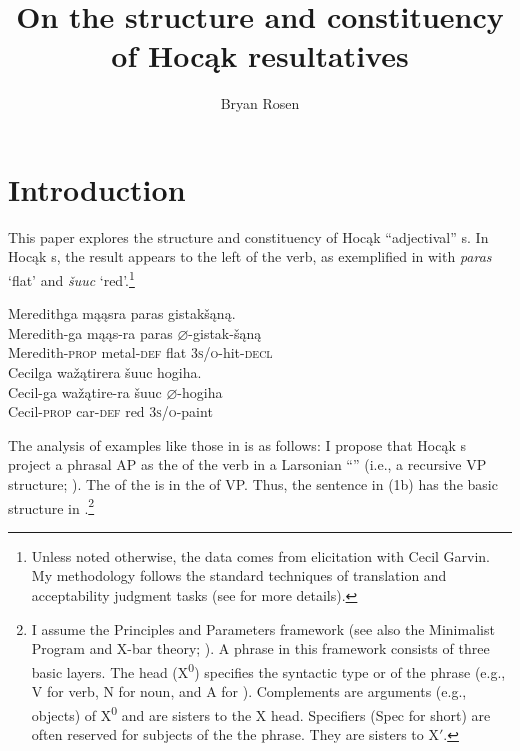 \documentclass[output=paper]{LSP/langsci}
\author{Bryan Rosen}
\title{On the structure and constituency of {Hocąk} resultatives}
\begin{document}
\section{Introduction}\label{sec:rosen:1}

This paper explores the structure and constituency of Hocąk ``adjectival'' s. In Hocąk s, the result  appears to the left of the verb, as exemplified in  with \textit{paras} `flat' and \textit{šuuc} `red'.\footnote{Unless noted otherwise, the data comes from  elicitation with Cecil Garvin. My methodology follows the standard techniques of translation and acceptability judgment tasks (see \citealt{Matthewson2004} for more details).}

\ea\label{ex:rosen:1}
\ea
\glll Meredithga mąąsra paras gistakšąną. \\
 Meredith-ga mąąs-ra paras {$\varnothing$}-gistak-šąną\\
Meredith-\textsc{prop} metal-\textsc{def} flat  \textsc{3s/o}-hit-\textsc{decl}\\

\ex 
\glll Cecilga wažątirera šuuc hogiha. \\
Cecil-ga  wažątire-ra šuuc {$\varnothing$}-hogiha \\
Cecil-\textsc{prop} car-\textsc{def} red \textsc{3s/o}-paint\\
\z
\z


The analysis of examples like those in  is as follows: I propose that Hocąk s project a phrasal AP as the  of the verb in a Larsonian ``'' (i.e., a recursive VP structure; \citealt{Larson1988}). The  of the  is in the  of VP. Thus, the sentence in (1b) has the basic structure in .\footnote{I assume the Principles and Parameters framework (see also the Minimalist Program and X-bar theory; \citealt{Chomsky1995}). A phrase in this framework consists of three basic layers. The head (X\textsuperscript{0}) specifies the syntactic type or  of the phrase (e.g., V for verb, N for noun, and A for ). Complements are arguments (e.g., objects) of X\textsuperscript{0} and are sisters to the X head. Specifiers (Spec for short) are often reserved for subjects of the the phrase. They are sisters to X$'$.}
\end{document}
